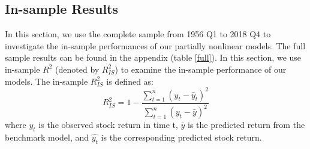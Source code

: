 \documentclass[a4paper,12pt,times,numbered,print,index]{report}
\numberwithin{equation}{section}
\begin{document}





\subsection{In-sample Results}
In this section, we use the complete sample from 1956 Q1 to 2018 Q4 to investigate the in-sample performances of our partially nonlinear models. The full sample results can be found in the appendix (table \ref{full}). In this section, we use in-sample $R^2$ (denoted by $R^2_{IS}$) to examine the in-sample performance of our models.
The in-sample $R^2_{IS}$ is defined as:
\begin{equation}
	R_{IS}^{2}=1-\frac{\sum_{t=1}^{n}\left(y_{t}-\widehat{y}_{t}\right)^{2}}{\sum_{t=1}^{n}\left(y_{t}-\bar{y}\right)^{2}}
\end{equation}
where $y_t$ is the observed stock return in time t, $\bar{y}$ is the predicted return from the benchmark model, and $\hat{y_{t}}$ is the corresponding predicted stock return. 

\end{document}
